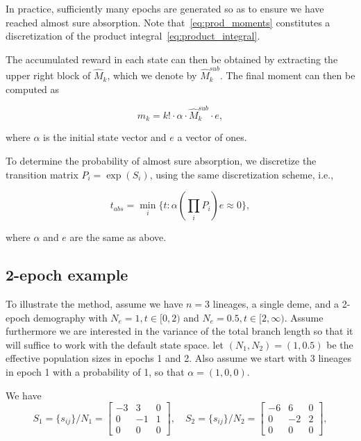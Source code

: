 \documentclass[hidelinks,11pt]{article}
\begin{document}
    In practice, sufficiently many epochs are generated so as to ensure we have reached almost sure absorption.
    Note that~\eqref{eq:prod_moments} constitutes a discretization of the product integral~\eqref{eq:product_integral}.

    The accumulated reward in each state can then be obtained by extracting the upper right block of $\hat{M}_k$, which we denote by $\hat{M}_k^{sub}$.
    The final moment can then be computed as

    \begin{equation*}
        m_k = k! \cdot \alpha \cdot \hat{M}_k^{sub} \cdot e,
    \end{equation*}

    where $\alpha$ is the initial state vector and $e$ a vector of ones.

    To determine the probability of almost sure absorption, we discretize the transition matrix $P_i = \exp(S_i)$, using the same discretization scheme, i.e.,

    \begin{equation*}
        t_{abs} = \min_i\{t: \alpha (\prod_i P_i) e \approx 0 \},
    \end{equation*}

    where $\alpha$ and $e$ are the same as above.

    \subsection{2-epoch example}\label{subsec:2-epoch-example}
    To illustrate the method, assume we have $n=3$ lineages, a single deme, and a 2-epoch demography with $N_e = 1, t \in [0, 2)$ and $N_e = 0.5, t \in [2, \infty)$.
    Assume furthermore we are interested in the variance of the total branch length so that it will suffice to work with the default state space.
    let $(N_1, N_2) = (1, 0.5)$ be the effective population sizes in epochs 1 and 2.
    Also assume we start with 3 lineages in epoch 1 with a probability of 1, so that $\alpha = (1, 0, 0)$.

    We have
    \begin{equation*}
        S_1 = \{s_{ij}\} / N_1 =
        \begin{bmatrix}
            -3 & 3 & 0 \\ 0 & -1 & 1 \\ 0 & 0 & 0
        \end{bmatrix}, \quad
        S_2 = \{s_{ij}\} / N_2 =
        \begin{bmatrix}
            -6 & 6 & 0 \\ 0 & -2 & 2 \\ 0 & 0 & 0
        \end{bmatrix},
    \end{equation*}
\end{document}
